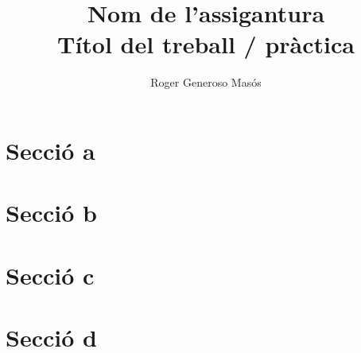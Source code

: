 \documentclass[12pt]{article}
\begin{document}
 

\title{\textbf{Nom de l'assigantura \\ Títol del treball / pràctica }}
\author{Roger Generoso Masós}
\maketitle

\tableofcontents
\newpage
\restoregeometry

\section{Secció a}
\section{Secció b}
\section{Secció c}
\section{Secció d}
\end{document}

